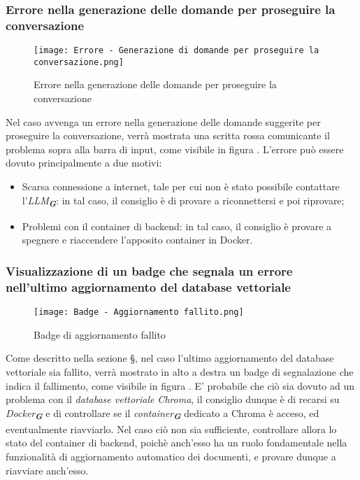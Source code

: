 \subsubsection{Errore nella generazione delle domande per proseguire la conversazione}

\begin{figure}[h]
    \centering
        \texttt{[image: Errore - Generazione di domande per proseguire la conversazione.png]}
        \caption{Errore nella generazione delle domande per proseguire la conversazione}
        \label{fig:Errore nella generazione delle domande per proseguire la conversazione}
\end{figure}

Nel caso avvenga un errore nella generazione delle domande suggerite per proseguire la conversazione, verrà mostrata una scritta rossa comunicante il problema sopra alla barra di input, come visibile in figura . L'errore può essere dovuto principalmente a due motivi:
\begin{itemize}
    \item Scarsa connessione a internet, tale per cui non è stato possibile contattare l'\emph{LLM}\textsubscript{\textbf{\textit{G}}}: in tal caso, il consiglio è di provare a riconnettersi e poi riprovare;
    \item Problemi con il container di backend: in tal caso, il consiglio è provare a spegnere e riaccendere l'apposito container in Docker.
\end{itemize}


\subsubsection{Visualizzazione di un badge che segnala un errore nell'ultimo aggiornamento del database vettoriale}

\begin{figure}[h]
    \centering
        \texttt{[image: Badge - Aggiornamento fallito.png]}
        \caption{Badge di aggiornamento fallito}
        \label{fig:Badge di aggiornamento fallito}
\end{figure}

Come descritto nella sezione \S{}, nel caso l'ultimo aggiornamento del database vettoriale sia fallito, verrà mostrato in alto a destra un badge di segnalazione che indica il fallimento, come visibile in figura . E' probabile che ciò sia dovuto ad un problema con il \emph{database vettoriale} \emph{Chroma}, il consiglio dunque è di recarsi su \emph{Docker}\textsubscript{\textbf{\textit{G}}} e di controllare se il \emph{container}\textsubscript{\textbf{\textit{G}}} dedicato a Chroma è acceso, ed eventualmente riavviarlo. Nel caso ciò non sia sufficiente, controllare allora lo stato del container di backend, poichè anch'esso ha un ruolo fondamentale nella funzionalità di aggiornamento automatico dei documenti, e provare dunque a riavviare anch'esso.


